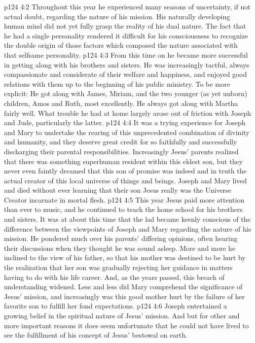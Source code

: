 \vs p124 4:2 Throughout this year he experienced many seasons of uncertainty, if not actual doubt, regarding the nature of his mission. His naturally developing human mind did not yet fully grasp the reality of his dual nature. The fact that he had a single personality rendered it difficult for his consciousness to recognize the double origin of those factors which composed the nature associated with that selfsame personality.
\vs p124 4:3 From this time on he became more successful in getting along with his brothers and sisters. He was increasingly tactful, always compassionate and considerate of their welfare and happiness, and enjoyed good relations with them up to the beginning of his public ministry. To be more explicit: He got along with James, Miriam, and the two younger (as yet unborn) children, Amos and Ruth, most excellently. He always got along with Martha fairly well. What trouble he had at home largely arose out of friction with Joseph and Jude, particularly the latter.
\pc \vs p124 4:4 It was a trying experience for Joseph and Mary to undertake the rearing of this unprecedented combination of divinity and humanity, and they deserve great credit for so faithfully and successfully discharging their parental responsibilities. Increasingly Jesus’ parents realized that there was something superhuman resident within this eldest son, but they never even faintly dreamed that this son of promise was indeed and in truth the actual creator of this local universe of things and beings. Joseph and Mary lived and died without ever learning that their son Jesus really was the Universe Creator incarnate in mortal flesh.
\vs p124 4:5 This year Jesus paid more attention than ever to music, and he continued to teach the home school for his brothers and sisters. It was at about this time that the lad became keenly conscious of the difference between the viewpoints of Joseph and Mary regarding the nature of his mission. He pondered much over his parents’ differing opinions, often hearing their discussions when they thought he was sound asleep. More and more he inclined to the view of his father, so that his mother was destined to be hurt by the realization that her son was gradually rejecting her guidance in matters having to do with his life career. And, as the years passed, this breach of understanding widened. Less and less did Mary comprehend the significance of Jesus’ mission, and increasingly was this good mother hurt by the failure of her favorite son to fulfill her fond expectations.
\vs p124 4:6 Joseph entertained a growing belief in the spiritual nature of Jesus’ mission. And but for other and more important reasons it does seem unfortunate that he could not have lived to see the fulfillment of his concept of Jesus’ bestowal on earth.
